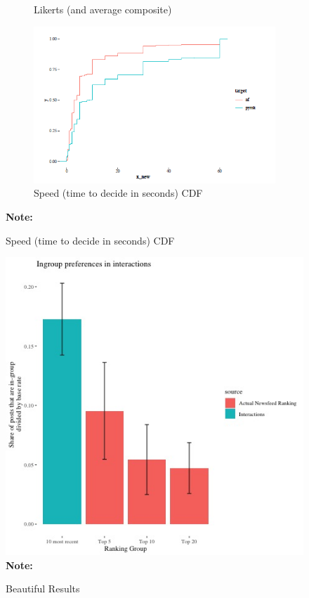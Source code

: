 \documentclass[12pt,letterpaper]{article}
\begin{document}
\begin{figure}
\begin{subfigure}{.5\textwidth}
        \caption{Likerts (and average composite)}
        \label{fig:auto_likerts}
    \end{subfigure}
    \begin{subfigure}{.5\textwidth}
        \centering
        \includegraphics[width=1\linewidth]{Output/Graphs/Experiments/Automaticity/speed cdf.png}  
        \caption{Speed (time to decide in seconds) CDF}
        \label{fig:auto_cdf}
    \end{subfigure}
\label{fig:auto}
\footnotesize \textbf{Note:} 
\end{figure}

\begin{figure}[!h]
    \caption{Beautiful Results}
    \label{fig:behavior}
    \centering
    \includegraphics[width=1\linewidth]{Output/Graphs/Audit/Interactions/US preferences reactions and actual rankings above base rate.jpg}
\footnotesize \textbf{Note:} 
\end{figure}
\end{document}
